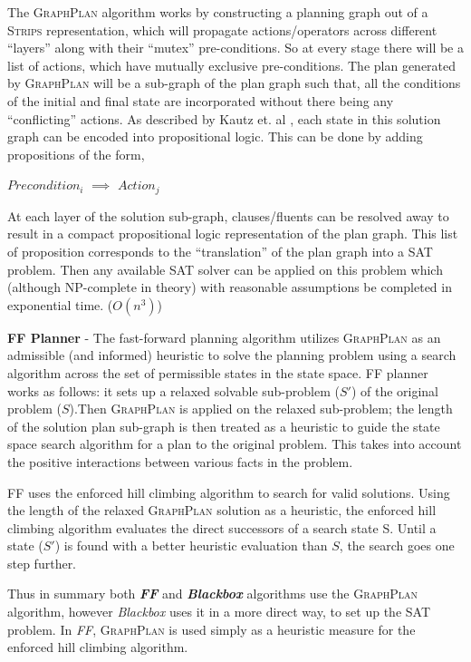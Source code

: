 \documentclass[10pt, letter]{article}
\begin{document}
The \textsc{GraphPlan} algorithm works by constructing a planning graph out of a \textsc{Strips} representation, which will propagate actions/operators across different ``layers'' along with their ``mutex'' pre-conditions. So at every stage there will be a list of actions, which have mutually exclusive pre-conditions. The plan generated by \textsc{GraphPlan} will be a sub-graph of the plan graph such that, all the conditions of the initial and final state are incorporated without there being any ``conflicting'' actions. As described by Kautz et. al \cite{kautz1996encoding}, each state in this solution graph can be encoded into propositional logic. This can be done by adding propositions of the form,
\begin{center}
$Precondition_i$ $\implies$ $Action_j$
\end{center}
At each layer of the solution sub-graph, clauses/fluents can be resolved away to result in a compact propositional logic representation of the plan graph. This list of proposition corresponds to the ``translation'' of the plan graph into a SAT problem. Then any available SAT solver can be applied on this problem which (although NP-complete in theory) with reasonable assumptions be completed in exponential time. ($O(n^3)$)

\textbf{FF Planner} - The fast-forward planning algorithm utilizes \textsc{GraphPlan} as an admissible (and informed) heuristic to solve the planning problem using a search algorithm across the set of permissible states in the state space. FF planner works as follows: it sets up a relaxed solvable sub-problem ($S\prime$) of the original problem ($S$).Then \textsc{GraphPlan} is applied on the relaxed sub-problem; the length of the solution plan sub-graph is then treated as a heuristic to guide the state space search algorithm for a plan to the original problem. This takes into account the positive interactions between various facts in the problem.

FF uses the enforced hill climbing algorithm to search for valid solutions. Using the length of the relaxed \textsc{GraphPlan} solution as a heuristic, the enforced hill climbing algorithm evaluates the direct successors of a search state S. Until a state ($S\prime$) is found with a better heuristic evaluation than $S$, the search goes one step further.

Thus in summary both \textit{\textbf{FF}} and \textit{\textbf{Blackbox}} algorithms use the \textsc{GraphPlan} algorithm, however \textit{Blackbox} uses it in a more direct way, to set up the SAT problem. In \textit{FF}, \textsc{GraphPlan} is used simply as a heuristic measure for the enforced hill climbing algorithm.
\end{document}
